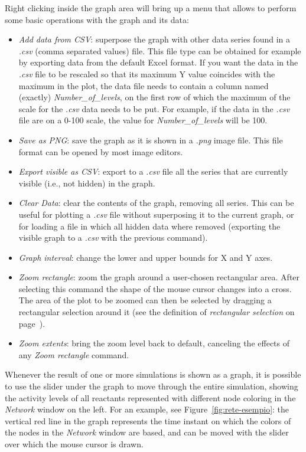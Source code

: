 Right clicking inside the graph area will bring up a menu that allows to perform some basic operations with the graph
and its data:
\begin{itemize}
  \item \emph{Add data from CSV}: superpose the graph with other data series found in a \emph{.csv} (comma separated values) file. This file type can be
obtained for example by exporting data from the default Excel format. If you want the data in the \emph{.csv} file to be rescaled so
that its maximum Y value coincides with the maximum in the plot, the data file needs to contain a column named (exactly)
\emph{Number\_{}of\_{}levels}, on the first row of which the maximum of the scale for the \emph{.csv} data needs to be put. For example,
if the data in the \emph{.csv} file are on a 0-100 scale, the value for \emph{Number\_{}of\_{}levels} will be 100.
  \item \emph{Save as PNG}: save the graph as it is shown in a \emph{.png} image file. This file format can be opened by most
image editors.
  \item \emph{Export visible as CSV}: export to a \emph{.csv} file all the series that are currently visible (i.e., not hidden)
in the graph.
  \item \emph{Clear Data}: clear the contents of the graph, removing all series. This can be useful for plotting
a \emph{.csv} file without superposing it to the current graph, or for loading a file in which all hidden data where removed
(exporting the visible graph to a \emph{.csv} with the previous command).
  \item \emph{Graph interval}: change the lower and upper bounds for X and Y axes.
  \item \emph{Zoom rectangle}: zoom the graph around a user-chosen rectangular area.
    After selecting this command the shape of the mouse cursor changes into a cross. The area of the plot to be
    zoomed can then be selected by dragging a rectangular selection around it (see the definition of \emph{rectangular
    selection} on page~\pageref{nota:rectangular-selection}).
  \item \emph{Zoom extents}: bring the zoom level back to default, canceling the effects of any \emph{Zoom rectangle}
command.
\end{itemize}

Whenever the result of one or more simulations is shown as a graph, it is possible to use the slider under the graph to
move through the entire simulation, showing the activity levels of all reactants represented with different node coloring in
the \emph{Network} window on the left. For an example, see Figure~\ref{fig:rete-esempio}: the vertical red line in the
graph represents the time instant on which the colors of the nodes in the \emph{Network} window are based, and can
be moved with the slider over which the mouse cursor is drawn.




